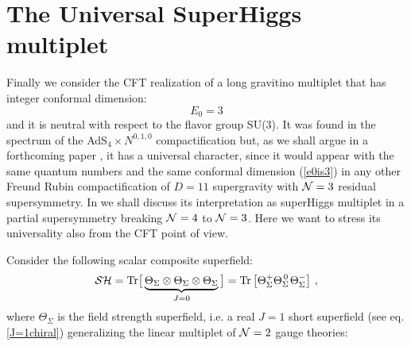 \documentclass[a4paper,12pt]{article}
\def\n010{N^{0,1,0}}
\begin{document}
\section{The Universal SuperHiggs multiplet}
\label{suphigs}
Finally we consider the CFT realization of a long gravitino multiplet that
has integer conformal dimension:
\begin{equation}
  E_0 =3
\label{e0is3}
\end{equation}
and it is neutral with respect to the flavor group SU(3).
It was found in the spectrum of the AdS$_4 \times \n010$
compactification \cite{osp34} but, as we shall argue in a forthcoming
paper \cite{noinext}, it has a universal character, since it would
appear with the same quantum numbers and the same conformal dimension
(\ref{e0is3}) in any other Freund Rubin compactification of $D=11$
supergravity with ${\cal N}=3$ residual supersymmetry.
In \cite{noinext} we shall discuss its interpretation as superHiggs
multiplet in a partial supersymmetry breaking
${\cal N}=4$ to ${\cal N}=3$.
Here we want to stress its universality also from the CFT point of view.
\par
Consider the following scalar composite superfield:
\begin{equation}
{\cal SH}={\rm Tr}\big[\underbrace{\Theta_\Sigma\otimes\Theta_\Sigma\otimes
\Theta_\Sigma}_{J=0}\big]={\rm Tr}\left[\Theta_\Sigma^+\Theta_\Sigma^{\,0\,}
\Theta_\Sigma^-\right]\,,\label{superHiggs}
\end{equation}
where $\Theta_\Sigma$ is the field strength superfield, i.e. a real
$J=1$ short superfield (see eq. \ref{J=1chiral}) generalizing the linear
multiplet of ${\cal N}=2$ gauge theories:
\end{document}
